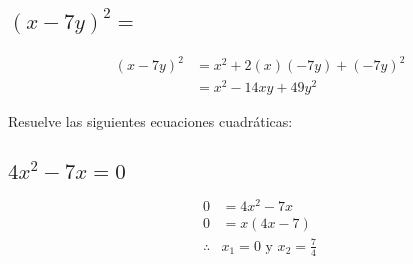 \documentclass[12pt,addpoints]{evalua}
\begin{document}
\begin{questions}
\begin{multicols}{2}
\begin{parts}

            \part {\Large $(x-7y)^2=$}

            \begin{solutionbox}{3cm}\large
                \begin{align*}
                    (x-7y)^2 & = x^2+2(x)(-7y)+(-7y)^2 \\
                             & = x^2-14xy+49y^2
                \end{align*}
            \end{solutionbox}





        \end{parts}
    \end{multicols}

    \question[10] Resuelve las siguientes ecuaciones cuadráticas:

    \begin{multicols}{2}
        \begin{parts}
            \part {\Large $4x^2-7x=0$}

            \begin{solutionbox}{4cm}
                \begin{align*}
                    0          & =	      4x^2-7x                    \\
                    0          & =		 x(4x -7)                       \\
                    \therefore & x_1 =0 \text{ y } x_2 =\frac{7}{4}
                \end{align*}
            \end{solutionbox}



\end{parts}
\end{multicols}
\end{questions}
\end{document}
